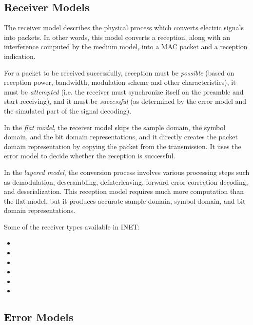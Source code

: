\subsection{Receiver Models}

The receiver model describes the physical process which converts electric
signals into packets. In other words, this model converts a reception, along
with an interference computed by the medium model, into a MAC packet and a
reception indication.

For a packet to be received successfully, reception must be \textit{possible}
(based on reception power, bandwidth, modulation scheme and other characteristics),
it must be \textit{attempted} (i.e. the receiver must synchronize itself on
the preamble and start receiving), and it must be \textit{successful} 
(as determined by the error model and the simulated part of the signal decoding).

In the \textit{flat model}, the receiver model skips the sample domain, the symbol domain,
and the bit domain representations, and it directly creates the packet domain
representation by copying the packet from the transmission. It uses the error
model to decide whether the reception is successful.

In the \textit{layered model}, the conversion process involves various processing steps
such as demodulation, descrambling, deinterleaving, forward error correction
decoding, and deserialization. This reception model requires much more
computation than the flat model, but it produces accurate sample domain, 
symbol domain, and bit domain representations.

Some of the receiver types available in INET:

\begin{itemize}
  \item {}
  \item {}
  \item {}
  \item {}
  \item {}
  \item {}
\end{itemize}


\subsection{Error Models}

